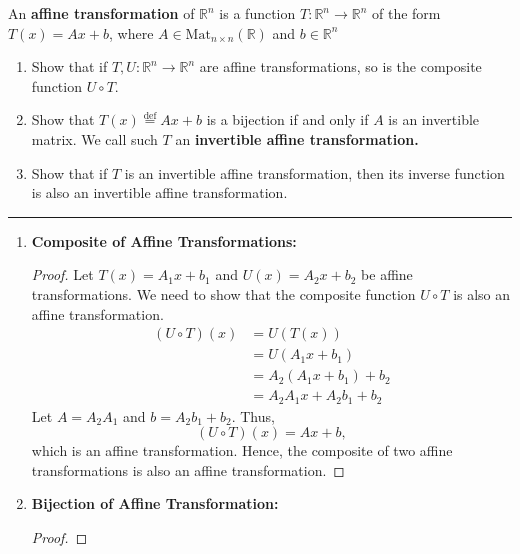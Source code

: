 \documentclass[12pt]{amsart}
\theoremstyle{definition}
\numberwithin{equation}{section}
\newcommand{\R}{\mathbb{R}}
\begin{document}
        \newpage
\begin{exercise}{3} An \textbf{affine transformation} of \(\R^n\) is a function \(T: \R^n \rightarrow \R^n \) of the form \(T(x)= Ax+b\), where \(A \in \text{Mat}_{n\times n}(\R)\) and \(b \in \R^n\) 

        \begin{enumerate}[label=\alph*.]
            \item Show that if \(T,U : \R^n \rightarrow \R^n\) are affine transformations, so is the composite function \(U \circ T\).

            \item Show that \(T(x) \stackrel{\text{def}}{=} Ax+b\) is a bijection if and only if \(A\) is an invertible matrix. We call such \(T\) an  \textbf{invertible affine transformation.}

            \item Show that if \(T\) is an invertible affine transformation, then its inverse function is also an invertible affine transformation.
        \end{enumerate}
        \noindent\rule{\linewidth}{1pt}
        
        \begin{enumerate}[label=\alph*.]
            \item \textbf{Composite of Affine Transformations:}
            \begin{proof}
                
                Let \(T(x) = A_1x + b_1\) and \(U(x) = A_2x + b_2\) be affine transformations. We need to show that the composite function \(U \circ T\) is also an affine transformation.
                \begin{align*}
                (U \circ T)(x) &= U(T(x)) \\
                &= U(A_1x + b_1) \\
                &= A_2(A_1x + b_1) + b_2 \\
                &= A_2A_1x + A_2b_1 + b_2
                \end{align*}
                Let \(A = A_2A_1\) and \(b = A_2b_1 + b_2\). Thus,
                \[
                (U \circ T)(x) = Ax + b,
                \]
                which is an affine transformation. Hence, the composite of two affine transformations is also an affine transformation.
            
            \end{proof}
            \item \textbf{Bijection of Affine Transformation:}
            \begin{proof}
                

\end{proof}
\end{enumerate}
\end{exercise}
\end{document}

